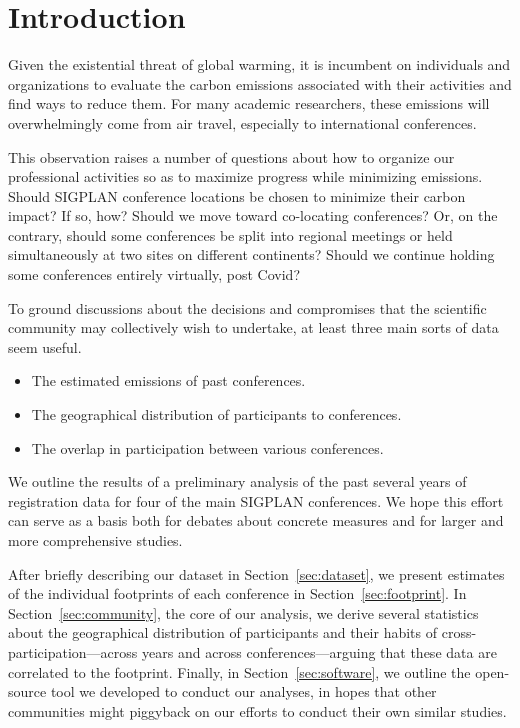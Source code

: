 \section{Introduction}

Given the existential threat of global warming, it is incumbent on
individuals and organizations to evaluate the carbon emissions
associated with their activities and find ways to reduce them.  For many
academic researchers, these emissions will overwhelmingly come from air
travel, especially to international conferences.

This observation raises a number of questions about how to organize our
professional activities so as to maximize progress while minimizing
emissions.  Should SIGPLAN conference locations be chosen to minimize their
carbon impact? If
so, how? Should we move toward co-locating conferences? Or, on the contrary,
should some conferences be split into regional meetings or held
simultaneously at two sites on different continents?
Should we continue holding some conferences entirely virtually,
post Covid?

To ground discussions about the decisions and compromises that the
scientific community may collectively wish to undertake, at least three
main sorts of data seem useful.
\begin{itemize}
\item The estimated emissions of past conferences.
\item The geographical distribution of participants to conferences.
\item The overlap in participation between various conferences.
\end{itemize}

We outline the results of a preliminary analysis of the past several
years of registration data for four of the main SIGPLAN conferences.  We
hope this effort can serve as a basis both for debates about concrete
measures and for larger and more comprehensive studies.

After briefly describing our dataset in Section~\ref{sec:dataset}, we
present estimates of the individual footprints of each conference in
Section~\ref{sec:footprint}.  In Section~\ref{sec:community}, the core of
our analysis, we derive several statistics about the geographical
distribution of participants and their habits of
cross-participation---across years and across conferences---arguing that
these data are correlated to the footprint.
Finally, in Section~\ref{sec:software}, we outline the open-source tool
we developed to conduct our analyses, in hopes that other communities might
piggyback on our efforts to conduct their own similar studies.
